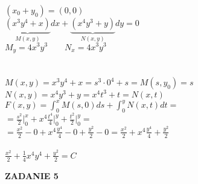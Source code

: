 \documentclass[10pt,a4paper]{article}
\begin{document}
	\begin{center}
		$(x_{0} + y_{0}) = (0,0) $ \\
		$\underbrace{(x^3y^4 + x)}_{M(x,y)}dx + \underbrace{(x^4y^3 + y)}_{N(x,y)}dy = 0 $\\
		$M_{y} = 4x^3y^3 \qquad N_{x} = 4x^3y^3$ \\
		 \\
		 \\
		$M(x,y) = x^3y^4 + x = s^3\cdot 0^4 + s = M(s,y_{0}) = s$ \\ 
		$N(x,y) = x^4y^3 + y = x^4t^3 + t = N(x,t) $ \\ 
		$F(x,y) = \int_{0}^{x} M(s,0) ds + \int_{0}^{y} N(x,t) dt = $ \\
		$=\frac{s^2}{2} \Bigg|_{0}^{x} + x^4\frac{t^4}{4} \Bigg|_{0}^{y} + \frac{t^2}{2} \Bigg|_{0}^{y} =$ \\
		$=\frac{x^2}{2} - 0 + x^4\frac{y^4}{4} - 0 + \frac{y^2}{2} - 0 = \frac{x^2}{2} + x^4\frac{y^4}{4}  + \frac{y^2}{2}$ \\
		\\
		$\frac{x^2}{2} + \frac{1}{4}x^4y^4  + \frac{y^2}{2} = C $
	
	
	
	\newpage	
	\end{center}		
	\textbf{ZADANIE 5}
\end{document}
